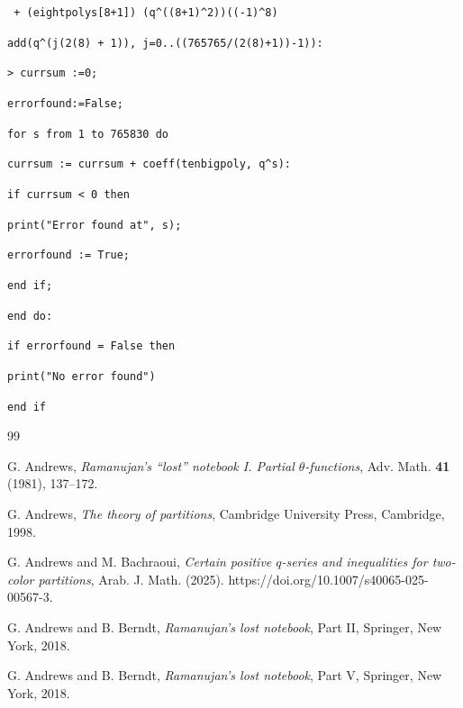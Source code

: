 \documentclass[12pt,reqno]{amsart}
\renewcommand{\(}{\left\(}
\renewcommand{\)}{\right\)}
\numberwithin{equation}{section}
\theoremstyle{plain}
\theoremstyle{definition}
\numberwithin{equation}{section}
\begin{document}
\verb! + (eightpolys[8+1]) (q^((8+1)^2))((-1)^8)!

\quad \quad \verb!add(q^(j(2(8) + 1)), j=0..((765765/(2(8)+1))-1)):!

\verb!> currsum :=0;!

\quad \verb!errorfound:=False;!

\quad \verb!for s from 1 to 765830 do!

\quad \verb!currsum := currsum + coeff(tenbigpoly, q^s):!

\quad \verb!if currsum < 0 then!

\quad \verb!print("Error found at", s);!

\quad \verb!errorfound := True;!

\quad \verb!end if;!

\quad \verb!end do:!

\quad \verb!if errorfound = False then!

\quad \verb!print("No error found")!

\quad \verb!end if!

\phantom{.}



	
	\begin{thebibliography}{99}

		 G. Andrews, {\it Ramanujan's ``lost'' notebook I. Partial $\theta$-functions}, Adv. Math. {\bf 41} (1981), 137--172.
	
	 G. Andrews, {\it The theory of partitions}, Cambridge University Press, Cambridge, 1998.
	
	 G. Andrews and M. Bachraoui, {\it Certain positive $q$-series and inequalities for two-color partitions},  Arab. J. Math. (2025). https://doi.org/10.1007/s40065-025-00567-3.
	
	 G. Andrews and B. Berndt, {\it Ramanujan's lost notebook}, Part II, Springer, New York, 2018.
	
	 G. Andrews and B. Berndt, {\it Ramanujan's lost notebook}, Part V, Springer, New York, 2018.	
	
\end{thebibliography}
\end{document}

